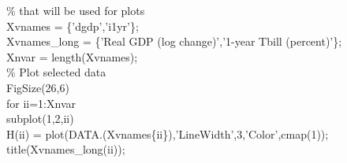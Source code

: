 \hspace{1mm}\hspace{5mm} \textcolor{matlabgreen}{\% that will be used \textcolor{matlabblue}{for} plots }\\ 
\hspace{1mm}\hspace{5mm} \hspace{5mm} Xvnames      = \{\textcolor{matlabpurple}{'dgdp'},\textcolor{matlabpurple}{'i1yr'}\}; \\ 
\hspace{1mm}\hspace{5mm} \hspace{5mm} Xvnames\_long = \{\textcolor{matlabpurple}{'Real GDP (log change)'},\textcolor{matlabpurple}{'1-year Tbill (percent)'}\}; \\ 
\hspace{1mm}\hspace{5mm} \hspace{5mm} Xnvar        = length(Xvnames); \\ 
\hspace{1mm}\hspace{5mm} \hspace{5mm} \textcolor{matlabgreen}{\% Plot selected data }\\ 
\hspace{1mm}\hspace{5mm} \hspace{5mm} FigSize(26,6) \\ 
\hspace{1mm}\hspace{5mm} \hspace{5mm} \textcolor{matlabblue}{for} ii=1:Xnvar \\ 
\hspace{1mm}\hspace{5mm} \hspace{5mm} \hspace{5mm} subplot(1,2,ii) \\ 
\hspace{1mm}\hspace{5mm} \hspace{5mm} \hspace{5mm} H(ii) = plot(DATA.(Xvnames\{ii\}),\textcolor{matlabpurple}{'LineWidth'},3,\textcolor{matlabpurple}{'Color'},cmap(1)); \\ 
\hspace{1mm}\hspace{5mm} \hspace{5mm} \hspace{5mm} title(Xvnames\_long(ii));  \\ 
